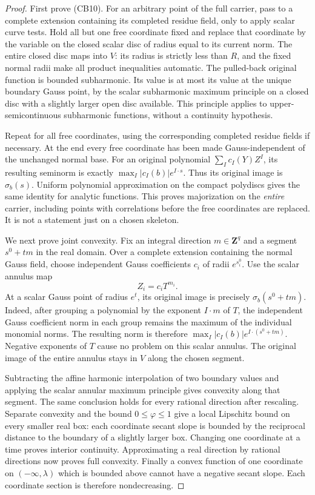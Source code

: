 \begin{proof}
First prove (CB10). For an arbitrary point of the full carrier,
pass to a complete extension containing its completed residue
field, only to apply scalar curve tests. Hold all but one free
coordinate fixed and replace that coordinate by the variable on
the closed scalar disc of radius equal to its current norm.
The entire closed disc maps into $V$: its radius is strictly
less than $R$, and the fixed normal radii make all product
inequalities automatic. The pulled-back original function is
bounded subharmonic. Its value is at most its value at the
unique boundary Gauss point, by the scalar subharmonic maximum
principle on a closed disc with a slightly larger open disc
available. This principle applies to upper-semicontinuous
subharmonic functions, without a continuity hypothesis.

Repeat for all free coordinates, using the corresponding
completed residue fields if necessary. At the end every free
coordinate has been made Gauss-independent of the unchanged
normal base. For an original polynomial
$\sum_I c_I(Y)Z^I$, its resulting seminorm is exactly
$\max_I|c_I(b)|e^{I\cdot s}$. Thus its original image is
$\sigma_b(s)$. Uniform polynomial approximation on the compact
polydiscs gives the same identity for analytic functions.
This proves majorization on the \emph{entire} carrier, including
points with correlations before the free coordinates are replaced.
It is not a statement just on a chosen skeleton.

We next prove joint convexity. Fix an integral direction
$m\in\mathbf Z^q$ and a segment $s^0+t m$ in the real domain.
Over a complete extension containing the normal Gauss field,
choose independent Gauss coefficients $c_i$ of radii $e^{s_i^0}$.
Use the scalar annulus map
\[
                         Z_i=c_iT^{m_i}.
 \tag{CB12}
\]
At a scalar Gauss point of radius $e^t$, its original image
is precisely $\sigma_b(s^0+t m)$. Indeed, after grouping a
polynomial by the exponent $I\cdot m$ of $T$, the independent
Gauss coefficient norm in each group remains the maximum of
the individual monomial norms. The resulting norm is therefore
$\max_I |c_I(b)|e^{I\cdot(s^0+t m)}$. Negative exponents of
$T$ cause no problem on this scalar annulus. The original image
of the entire annulus stays in $V$ along the chosen segment.

Subtracting the affine harmonic interpolation of two boundary
values and applying the scalar annular maximum principle gives
convexity along that segment. The same conclusion holds for every
rational direction after rescaling. Separate convexity and the
bound $0\le\varphi\le1$ give a local Lipschitz bound on every
smaller real box: each coordinate secant slope is bounded by the
reciprocal distance to the boundary of a slightly larger box.
Changing one coordinate at a time proves interior continuity.
Approximating a real direction by rational directions now proves
full convexity. Finally a convex function of one coordinate on
$(-\infty,\lambda)$ which is bounded above cannot have a
negative secant slope. Each coordinate section is therefore
nondecreasing.


\end{proof}
